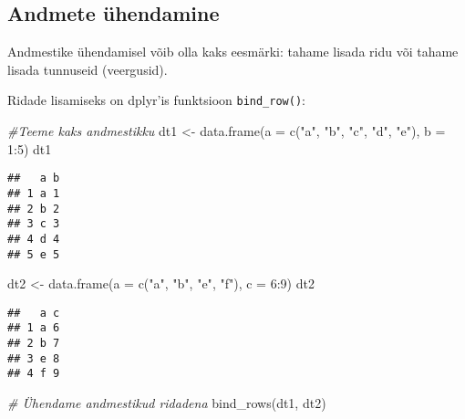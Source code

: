 \documentclass[
]{book}
\newenvironment{Shaded}{\begin{snugshade}}{\end{snugshade}}
\newcommand{\AttributeTok}[1]{\textcolor[rgb]{0.77,0.63,0.00}{#1}}
\newcommand{\CommentTok}[1]{\textcolor[rgb]{0.56,0.35,0.01}{\textit{#1}}}
\newcommand{\DecValTok}[1]{\textcolor[rgb]{0.00,0.00,0.81}{#1}}
\newcommand{\FunctionTok}[1]{\textcolor[rgb]{0.00,0.00,0.00}{#1}}
\newcommand{\NormalTok}[1]{#1}
\newcommand{\OtherTok}[1]{\textcolor[rgb]{0.56,0.35,0.01}{#1}}
\newcommand{\SpecialCharTok}[1]{\textcolor[rgb]{0.00,0.00,0.00}{#1}}
\newcommand{\StringTok}[1]{\textcolor[rgb]{0.31,0.60,0.02}{#1}}
\begin{document}
\hypertarget{andmete-uxfchendamine}{%
\subsection{Andmete ühendamine}\label{andmete-uxfchendamine}}

Andmestike ühendamisel võib olla kaks eesmärki: tahame lisada ridu või tahame lisada tunnuseid (veergusid).

Ridade lisamiseks on dplyr'is funktsioon \texttt{bind\_row()}:

\begin{Shaded}
\begin{Highlighting}[]
\CommentTok{\#Teeme kaks andmestikku}
\NormalTok{dt1 }\OtherTok{\textless{}{-}} \FunctionTok{data.frame}\NormalTok{(}\AttributeTok{a =} \FunctionTok{c}\NormalTok{(}\StringTok{"a"}\NormalTok{, }\StringTok{"b"}\NormalTok{, }\StringTok{"c"}\NormalTok{, }\StringTok{"d"}\NormalTok{, }\StringTok{"e"}\NormalTok{), }\AttributeTok{b =} \DecValTok{1}\SpecialCharTok{:}\DecValTok{5}\NormalTok{)}
\NormalTok{dt1}
\end{Highlighting}
\end{Shaded}

\begin{verbatim}
##   a b
## 1 a 1
## 2 b 2
## 3 c 3
## 4 d 4
## 5 e 5
\end{verbatim}

\begin{Shaded}
\begin{Highlighting}[]
\NormalTok{dt2 }\OtherTok{\textless{}{-}} \FunctionTok{data.frame}\NormalTok{(}\AttributeTok{a =} \FunctionTok{c}\NormalTok{(}\StringTok{"a"}\NormalTok{, }\StringTok{"b"}\NormalTok{, }\StringTok{"e"}\NormalTok{, }\StringTok{"f"}\NormalTok{), }\AttributeTok{c =} \DecValTok{6}\SpecialCharTok{:}\DecValTok{9}\NormalTok{)}
\NormalTok{dt2}
\end{Highlighting}
\end{Shaded}

\begin{verbatim}
##   a c
## 1 a 6
## 2 b 7
## 3 e 8
## 4 f 9
\end{verbatim}

\begin{Shaded}
\begin{Highlighting}[]
\CommentTok{\# Ühendame andmestikud ridadena}
\FunctionTok{bind\_rows}\NormalTok{(dt1, dt2)}
\end{Highlighting}
\end{Shaded}
\end{document}
